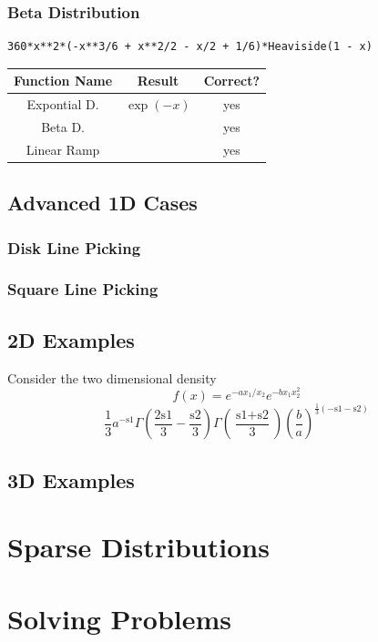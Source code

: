 \documentclass{article}
\begin{document}
\subsubsection{Beta Distribution}
\begin{verbatim}
360*x**2*(-x**3/6 + x**2/2 - x/2 + 1/6)*Heaviside(1 - x)
\end{verbatim}

\begin{tabular}{|c|c|c|}
\hline
Function Name & Result & Correct? \\
\hline
Expontial D. & $\exp(-x)$ & yes \\
Beta D. & & yes \\
Linear Ramp & & yes \\
\end{tabular}



\subsection{Advanced 1D Cases}

\subsubsection{Disk Line Picking}

\subsubsection{Square Line Picking}

\subsection{2D Examples}
Consider the two dimensional density
$$
f(x) = e^{-a x_1/x_2}e^{-b x_1 x_2^2}
$$
$$
 \frac{1}{3} a^{-\text{s1}} \Gamma \left(\frac{2 \text{s1}}{3}-\frac{\text{s2}}{3}\right) \Gamma \left(\frac{\text{s1}+\text{s2}}{3}\right) \left(\frac{b}{a}\right)^{\frac{1}{3}
    (-\text{s1}-\text{s2})}
$$


\subsection{3D Examples}


\section{Sparse Distributions}

\section{Solving Problems}
\end{document}
